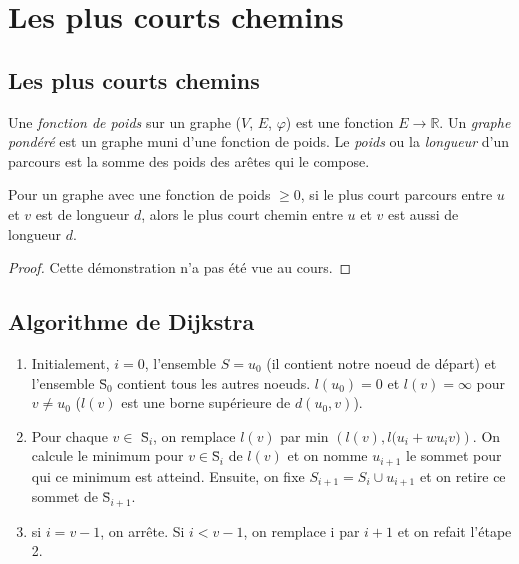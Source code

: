 \section{Les plus courts chemins}
\subsection{Les plus courts chemins}
\begin{mydef}
  Une \emph{fonction de poids} sur un graphe ($V$, $E$, $\varphi$) est une fonction $E \to \mathbb{R}$. Un \emph{graphe pondéré} est un graphe muni d’une fonction de poids. Le \emph{poids} ou la \emph{longueur} d’un parcours est la somme des poids des arêtes qui le compose.
\end{mydef}

\begin{mytheo} 
  Pour un graphe avec une fonction de poids $\geq 0$, si le plus court parcours entre $u$ et $v$ est de longueur $d$, alors le plus court chemin entre $u$ et $v$ est aussi de longueur $d$.
  \begin{proof}
     Cette démonstration n'a pas été vue au cours.
  \end{proof}
\end{mytheo}

\subsection{Algorithme de Dijkstra}
\begin{myalgo}
\begin{enumerate}
  \item Initialement, $i=0$, l'ensemble $S={u_{0}}$ (il contient notre noeud de départ) et l'ensemble \={S}$_{0}$ contient tous les autres noeuds. $l(u_{0})=0$ et $l(v)=\infty$ pour $v\ne u_{0}$ ($l(v)$ est une borne supérieure de $d(u_{0},v)$).
	\item Pour chaque $v \in$ \=S$_{i}$, on remplace $l(v)$ par min $({l(v),l(u_{i}+w{u_{i}v)}})$. On calcule le minimum pour $v \in$\=S$_{i}$ de $l(v)$ et on nomme $u_{i+1}$ le sommet pour qui ce minimum est atteind. Ensuite, on fixe $S_{i+1}=S_{i} \cup {u_{i+1}}$ et on retire ce sommet de \=S$_{i+1}$.
	\item si $i=v-1$, on arrête. Si $i < v-1$, on remplace i par $i+1$ et on refait l'étape 2.
	\end{enumerate}
\end{myalgo}

